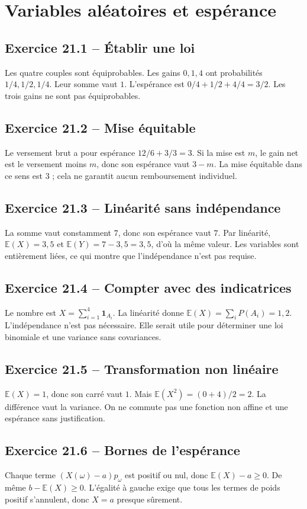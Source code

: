 \chapter{Variables aléatoires et espérance}
\section*{Exercice 21.1 -- Établir une loi}
Les quatre couples sont équiprobables. Les gains $0,1,4$ ont probabilités $1/4,1/2,1/4$. Leur somme vaut $1$. L'espérance est $0/4+1/2+4/4=3/2$. Les trois gains ne sont pas équiprobables.

\section*{Exercice 21.2 -- Mise équitable}
Le versement brut a pour espérance $12/6+3/3=3$. Si la mise est $m$, le gain net est le versement moins $m$, donc son espérance vaut $3-m$. La mise équitable dans ce sens est $3$ ; cela ne garantit aucun remboursement individuel.

\section*{Exercice 21.3 -- Linéarité sans indépendance}
La somme vaut constamment $7$, donc son espérance vaut $7$. Par linéarité, $\mathbb E(X)=3{,}5$ et $\mathbb E(Y)=7-3{,}5=3{,}5$, d'où la même valeur. Les variables sont entièrement liées, ce qui montre que l'indépendance n'est pas requise.

\section*{Exercice 21.4 -- Compter avec des indicatrices}
Le nombre est $X=\sum_{i=1}^4\mathbf1_{A_i}$. La linéarité donne $\mathbb E(X)=\sum_iP(A_i)=1{,}2$. L'indépendance n'est pas nécessaire. Elle serait utile pour déterminer une loi binomiale et une variance sans covariances.

\section*{Exercice 21.5 -- Transformation non linéaire}
$\mathbb E(X)=1$, donc son carré vaut $1$. Mais $\mathbb E(X^2)=(0+4)/2=2$. La différence vaut la variance. On ne commute pas une fonction non affine et une espérance sans justification.

\section*{Exercice 21.6 -- Bornes de l'espérance}
Chaque terme $(X(\omega)-a)p_\omega$ est positif ou nul, donc $\mathbb E(X)-a\ge0$. De même $b-\mathbb E(X)\ge0$. L'égalité à gauche exige que tous les termes de poids positif s'annulent, donc $X=a$ presque sûrement.
